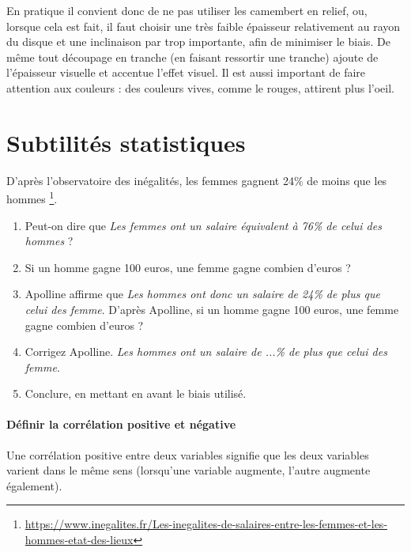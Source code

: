 \documentclass[10pt, a4paper]{article}
\begin{document}
En pratique il
convient donc de ne pas utiliser les camembert en relief, ou, lorsque cela est fait, il faut choisir une très faible épaisseur
relativement au rayon du disque et une inclinaison par trop importante, afin de minimiser le biais. De même tout
découpage en tranche (en faisant ressortir une tranche) ajoute de l’épaisseur visuelle et accentue l’effet visuel. Il est
aussi important de faire attention aux couleurs : des couleurs vives, comme le rouges, attirent plus l’oeil.

\section*{Subtilités statistiques}


\begin{tcolorbox}[lefttitle=2cm, colframe=gray!75!black, colback=white, title=\textbf{EXERCICE 1 : Subtilités statistiques. Une question de point de vue.}]

D'après l'observatoire des inégalités, les femmes gagnent 24\% de moins que les hommes \footnote{\url{https://www.inegalites.fr/Les-inegalites-de-salaires-entre-les-femmes-et-les-hommes-etat-des-lieux}}.

\begin{enumerate}
    \item Peut-on dire que \textit{Les femmes ont un salaire équivalent à 76\% de celui des hommes} ? %
    \item Si un homme gagne 100 euros, une femme gagne combien d'euros ?
    \item Apolline affirme que \textit{Les hommes ont donc un salaire de 24\% de plus que celui des femme}. D'après Apolline,  si un homme gagne 100 euros, une femme gagne combien d'euros ?
    \item Corrigez Apolline. \textit{Les hommes ont un salaire de ...\% de plus que celui des femme}.
    \item Conclure, en mettant en avant le biais utilisé.

\end{enumerate}

\vspace{3cm}



\end{tcolorbox}

\paragraph{Définir la corrélation positive et négative}
Une corrélation positive entre deux variables signifie que les deux variables varient dans le même sens (lorsqu'une variable augmente, l'autre augmente également).
\end{document}
